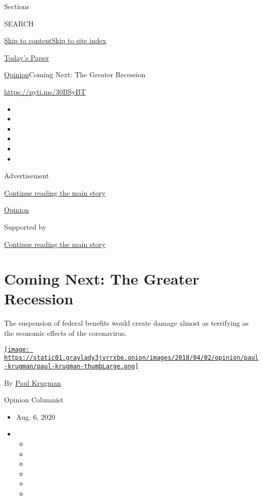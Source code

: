 Sections

SEARCH

\protect\hyperlink{site-content}{Skip to
content}\protect\hyperlink{site-index}{Skip to site index}

\href{https://myaccount.nytimes3xbfgragh.onion/auth/login?response_type=cookie\&client_id=vi}{}

\href{https://www.nytimes3xbfgragh.onion/section/todayspaper}{Today's
Paper}

\href{/section/opinion}{Opinion}\textbar{}Coming Next: The Greater
Recession

\url{https://nyti.ms/30BSyBT}

\begin{itemize}
\item
\item
\item
\item
\item
\item
\end{itemize}

Advertisement

\protect\hyperlink{after-top}{Continue reading the main story}

\href{/section/opinion}{Opinion}

Supported by

\protect\hyperlink{after-sponsor}{Continue reading the main story}

\hypertarget{coming-next-the-greater-recession}{%
\section{Coming Next: The Greater
Recession}\label{coming-next-the-greater-recession}}

The suspension of federal benefits would create damage almost as
terrifying as the economic effects of the coronavirus.

\href{https://www.nytimes3xbfgragh.onion/by/paul-krugman}{\texttt{[image: https://static01.graylady3jvrrxbe.onion/images/2018/04/02/opinion/paul-krugman/paul-krugman-thumbLarge.png]}}

By \href{https://www.nytimes3xbfgragh.onion/by/paul-krugman}{Paul
Krugman}

Opinion Columnist

\begin{itemize}
\item
  Aug. 6, 2020
\item
  \begin{itemize}
  \item
  \item
  \item
  \item
  \item
  \item
  \end{itemize}
\end{itemize}

